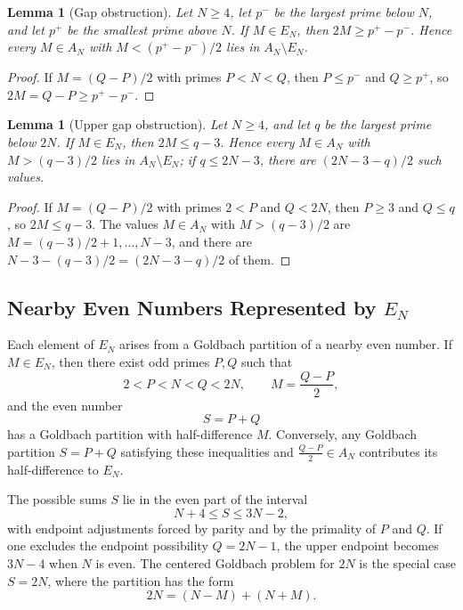 \documentclass[11pt]{amsart}
\newtheorem{Lemma}[Theorem]{Lemma}
\theoremstyle{definition}
\theoremstyle{remark}
\begin{document}
\begin{Lemma}[Gap obstruction]\label{lem:gap}
Let $N\geq 4$, let $p^-$ be the largest prime below $N$, and let $p^+$ be the smallest prime above $N$. If $M\in E_N$, then $2M\geq p^+-p^-$. Hence every $M\in A_N$ with $M<(p^+-p^-)/2$ lies in $A_N\setminus E_N$.
\end{Lemma}
\begin{proof}
If $M=(Q-P)/2$ with primes $P<N<Q$, then $P\leq p^-$ and $Q\geq p^+$, so $2M=Q-P\geq p^+-p^-$.
\end{proof}

\begin{Lemma}[Upper gap obstruction]\label{lem:gap-top}
Let $N\geq 4$, and let $q$ be the largest prime below $2N$. If $M\in E_N$, then $2M\leq q-3$. Hence every $M\in A_N$ with $M>(q-3)/2$ lies in $A_N\setminus E_N$; if $q\leq 2N-3$, there are $(2N-3-q)/2$ such values.
\end{Lemma}
\begin{proof}
If $M=(Q-P)/2$ with primes $2<P$ and $Q<2N$, then $P\geq 3$ and $Q\leq q$, so $2M\leq q-3$. The values $M\in A_N$ with $M>(q-3)/2$ are $M=(q-3)/2+1,\ldots,N-3$, and there are $N-3-(q-3)/2=(2N-3-q)/2$ of them.
\end{proof}

\subsection{Nearby Even Numbers Represented by $E_N$}\label{subsec:nearby-even}
Each element of $E_N$ arises from a Goldbach partition of a nearby even number. If $M\in E_N$, then there exist odd primes $P,Q$ such that
\[
2<P<N<Q<2N,\qquad M=\frac{Q-P}{2},
\]
and the even number
\[
S=P+Q
\]
has a Goldbach partition with half-difference $M$. Conversely, any Goldbach partition $S=P+Q$ satisfying these inequalities and $\frac{Q-P}{2}\in A_N$ contributes its half-difference to $E_N$.

The possible sums $S$ lie in the even part of the interval
\[
N+4\leq S\leq 3N-2,
\]
with endpoint adjustments forced by parity and by the primality of $P$ and $Q$. If one excludes the endpoint possibility $Q=2N-1$, the upper endpoint becomes $3N-4$ when $N$ is even. The centered Goldbach problem for $2N$ is the special case $S=2N$, where the partition has the form
\[
2N=(N-M)+(N+M).
\]
\end{document}
